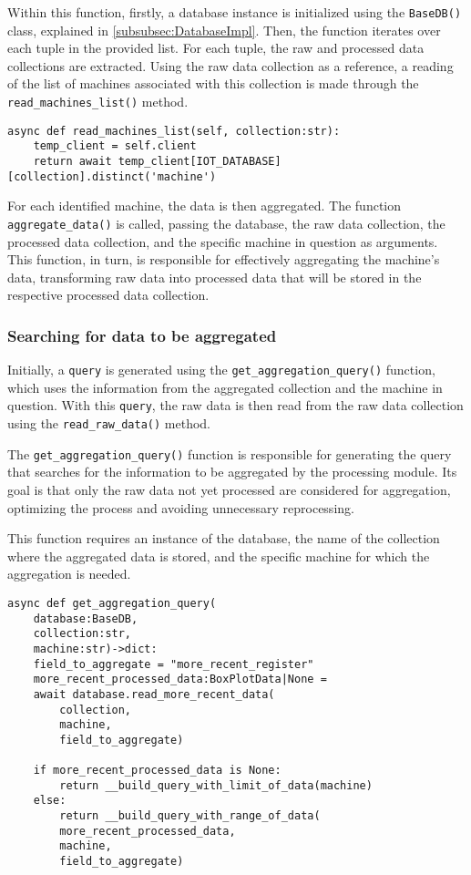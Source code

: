 Within this function, firstly, a database instance is initialized using the \texttt{BaseDB()} class, explained in \ref{subsubsec:DatabaseImpl}. Then, the function iterates over each tuple in the provided list. For each tuple, the raw and processed data collections are extracted. Using the raw data collection as a reference, a reading of the list of machines associated with this collection is made through the \texttt{read\_machines\_list()} method.

\begin{Verbatim}[fontsize=\small, baselinestretch=0.8]
async def read_machines_list(self, collection:str):
    temp_client = self.client
    return await temp_client[IOT_DATABASE][collection].distinct('machine')
\end{Verbatim}

For each identified machine, the data is then aggregated. The function \texttt{aggregate\_data()} is called, passing the database, the raw data collection, the processed data collection, and the specific machine in question as arguments. This function, in turn, is responsible for effectively aggregating the machine's data, transforming raw data into processed data that will be stored in the respective processed data collection.

\subsubsection{Searching for data to be aggregated}
Initially, a \texttt{query} is generated using the \texttt{get\_aggregation\_query()} function, which uses the information from the aggregated collection and the machine in question. With this \texttt{query}, the raw data is then read from the raw data collection using the \texttt{read\_raw\_data()} method.

The \texttt{get\_aggregation\_query()} function is responsible for generating the query that searches for the information to be aggregated by the processing module. Its goal is that only the raw data not yet processed are considered for aggregation, optimizing the process and avoiding unnecessary reprocessing.

This function requires an instance of the database, the name of the collection where the aggregated data is stored, and the specific machine for which the aggregation is needed.

\begin{Verbatim}[fontsize=\small, baselinestretch=0.8]
async def get_aggregation_query(
    database:BaseDB,
    collection:str,
    machine:str)->dict:
    field_to_aggregate = "more_recent_register"
    more_recent_processed_data:BoxPlotData|None = 
    await database.read_more_recent_data(
        collection,
        machine,
        field_to_aggregate)
    
    if more_recent_processed_data is None:
        return __build_query_with_limit_of_data(machine) 
    else:
        return __build_query_with_range_of_data(
        more_recent_processed_data,
        machine,
        field_to_aggregate)
\end{Verbatim}

